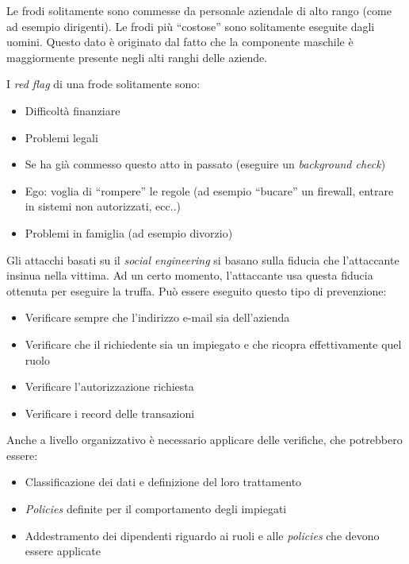 \begin{Answer} [
  ref={fr7},
  number={7}
 ]
 \Question Le frodi solitamente sono commesse da personale aziendale di alto 
rango (come ad esempio dirigenti). Le frodi pi\`u ``costose'' sono solitamente 
eseguite dagli uomini. Questo dato \`e originato dal fatto che la componente 
maschile \`e maggiormente presente negli alti ranghi delle aziende.

 \Question I \textit{red flag} di una frode solitamente sono:
 \begin{itemize}
  \item Difficoltà finanziare
  \item Problemi legali
  \item Se ha già commesso questo atto in passato (eseguire un
  \textit{background check})
  \item Ego: voglia di ``rompere'' le regole (ad esempio ``bucare'' un
  firewall, entrare in sistemi non autorizzati, ecc..)
  \item Problemi in famiglia (ad esempio divorzio)
\end{itemize}

 \Question Gli attacchi basati su il \textit{social engineering} si basano 
sulla fiducia che l'attaccante insinua nella vittima. Ad un certo momento, 
l'attaccante usa questa fiducia ottenuta per eseguire la truffa.
Pu\`o essere eseguito questo tipo di prevenzione:
\begin{itemize}
  \item Verificare sempre che l'indirizzo e-mail sia dell'azienda
  \item Verificare che il richiedente sia un impiegato e che ricopra
  effettivamente quel ruolo
  \item Verificare l'autorizzazione richiesta
  \item Verificare i record delle transazioni
\end{itemize}

Anche a livello organizzativo è necessario applicare delle verifiche, che
potrebbero essere:
\begin{itemize}
  \item Classificazione dei dati e definizione del loro trattamento
  \item \textit{Policies} definite per il comportamento degli impiegati
  \item Addestramento dei dipendenti riguardo ai ruoli e alle \textit{policies}
che devono essere applicate
\end{itemize}



\end{Answer}
